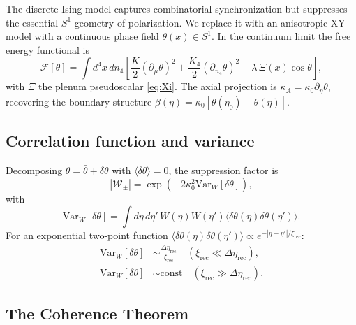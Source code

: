 \documentclass[12pt]{article}
\theoremstyle{definition}
\newcommand{\kA}{\kappa_A}
\newcommand{\Wrec}{\Delta\eta_{\mathrm{rec}}}
\newcommand{\xirec}{\xi_{\mathrm{rec}}}
\newcommand{\etaobs}{\eta_0}
\newcommand{\Wpm}{\mathcal{W}_\pm}
\newcommand{\VarW}{\mathrm{Var}_W}
\begin{document}
The discrete Ising model captures combinatorial synchronization but
suppresses the essential $S^1$ geometry of polarization.
We replace it with an anisotropic XY model \cite{KosterlitzThouless1973}
with a continuous phase field $\theta(x)\in S^1$.
In the continuum limit the free energy functional is
\begin{equation}
  \mathcal{F}[\theta]
  = \int d^4x\,dn_4
    \left[
      \frac{K}{2}(\partial_\mu\theta)^2
      + \frac{K_4}{2}(\partial_{n_4}\theta)^2
      - \lambda\,\Xi(x)\cos\theta
    \right],
  \label{eq:XY_free_energy}
\end{equation}
with $\Xi$ the plenum pseudoscalar \eqref{eq:Xi}.
The axial projection is $\kA=\kappa_0\partial_\eta\theta$,
recovering the boundary structure
$\beta(\eta)=\kappa_0[\theta(\etaobs)-\theta(\eta)]$.

\subsection{Correlation function and variance}

Decomposing $\theta=\bar\theta+\delta\theta$ with $\langle\delta\theta\rangle=0$,
the suppression factor is
\begin{equation}
  |\Wpm| = \exp\!\left(-2\kappa_0^2\VarW[\delta\theta]\right),
  \label{eq:Wpm_gauss}
\end{equation}
with
\begin{equation}
  \VarW[\delta\theta]
  = \int d\eta\,d\eta'\,W(\eta)W(\eta')
    \langle\delta\theta(\eta)\delta\theta(\eta')\rangle.
  \label{eq:Var_gaussian}
\end{equation}
For an exponential two-point function
$\langle\delta\theta(\eta)\delta\theta(\eta')\rangle
  \propto e^{-|\eta-\eta'|/\xirec}$:
\begin{align}
  \VarW[\delta\theta]
  &\sim \frac{\Wrec}{\xirec}
  \quad(\xirec\ll\Wrec),
  \label{eq:Var_incoherent}\\
  \VarW[\delta\theta]
  &\sim \mathrm{const}
  \quad(\xirec\gg\Wrec).
  \label{eq:Var_coherent}
\end{align}

\subsection{The Coherence Theorem}
\end{document}
